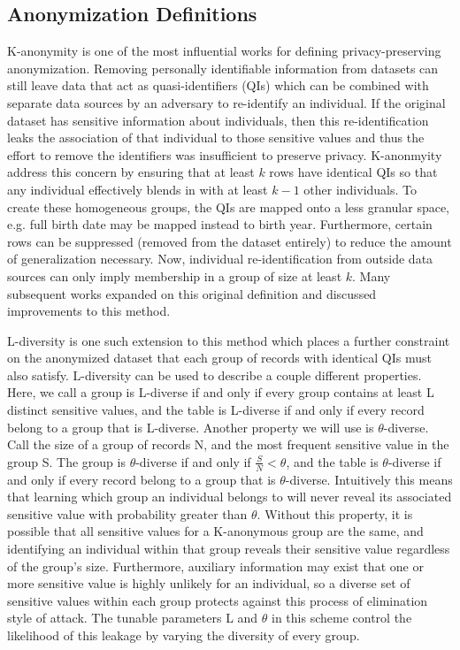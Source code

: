 \subsection{Anonymization Definitions}
K-anonymity\cite{sweeneykAnonymity} is one of the most influential works for defining privacy-preserving anonymization. Removing personally identifiable information from datasets can still leave data that act as quasi-identifiers (QIs) which can be combined with separate data sources by an adversary to re-identify an individual. If the original dataset has sensitive information about individuals, then this re-identification leaks the association of that individual to those sensitive values and thus the effort to remove the identifiers was insufficient to preserve privacy. K-anonmyity address this concern by ensuring that at least $k$ rows have identical QIs so that any individual effectively blends in with at least $k-1$ other individuals. To create these homogeneous groups, the QIs are mapped onto a less granular space, e.g. full birth date may be mapped instead to birth year. Furthermore, certain rows can be suppressed (removed from the dataset entirely) to reduce the amount of generalization necessary. Now, individual re-identification from outside data sources can only imply membership in a group of size at least $k$. Many subsequent works expanded on this original definition and discussed improvements to this method.

L-diversity\cite{machanavajjhalalDiversity} is one such extension to this method which places a further constraint on the anonymized dataset that each group of records with identical QIs must also satisfy. L-diversity can be used to describe a couple different properties. Here, we call a group is L-diverse if and only if every group contains at least L distinct sensitive values, and the table is L-diverse if and only if every record belong to a group that is L-diverse. Another property we will use is $\theta$-diverse. Call the size of a group of records N, and the most frequent sensitive value in the group S. The group is $\theta$-diverse if and only if $\frac{S}{N}<\theta$, and the table is $\theta$-diverse if and only if every record belong to a group that is $\theta$-diverse. Intuitively this means that learning which group an individual belongs to will never reveal its associated sensitive value with probability greater than $\theta$. Without this property, it is possible that all sensitive values for a K-anonymous group are the same, and identifying an individual within that group reveals their sensitive value regardless of the group's size. Furthermore, auxiliary information may exist that one or more sensitive value is highly unlikely for an individual, so a diverse set of sensitive values within each group protects against this process of elimination style of attack. The tunable parameters L and $\theta$ in this scheme control the likelihood of this leakage by varying the diversity of every group.

